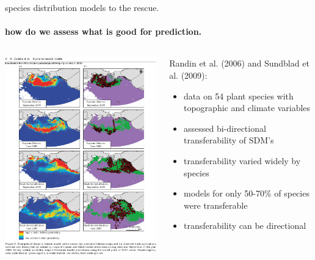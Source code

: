 \documentclass[show notes]{beamer}
\begin{document}
\begin{frame}{species distribution models to the rescue.}
  \framesubtitle{how do we assess what is good for prediction.} 
  
  \begin{columns}
  \begin{column}{.4\textwidth}
   \includegraphics[width=\textwidth]{habitat-suitability.pdf}
  \end{column}
  \begin{column}{.6\textwidth}
	Randin et al. (2006) and Sundblad et al. (2009): 
  	\begin{itemize}
    \item data on 54 plant species with topographic and climate variables
	\item assessed bi-directional transferability of SDM's
    \item transferability varied widely by species
    \item models for only 50-70\% of species were transferable
    \item transferability can be directional
    \end{itemize}
  \end{column}
  \end{columns}
\end{frame}
\end{document}
